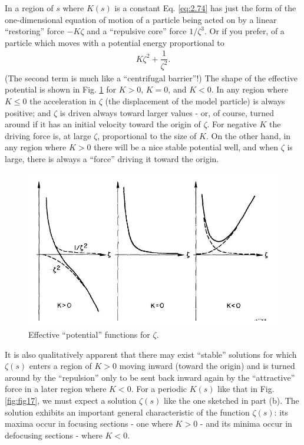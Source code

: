 In a region of $s$ where $K(s)$ is a constant Eq. \eqref{eq:2.74} has just the form of the
one-dimensional equation of motion of a particle being acted on by a linear “restoring” force $-K\zeta$ and a “repulsive core” force $1/\zeta^3$. Or if you prefer, of a particle which moves with a potential energy proportional to
\begin{align*}
	K \zeta^2 + \dfrac{1}{\zeta^2}.
\end{align*}
(The second term is much like a “centrifugal barrier”!) The shape of the effective potential is shown in Fig. \ref{fig:fig16} for $K > 0$, $K = 0$, and $K < 0$. In any region where $K \leq 0$ the acceleration in $\zeta$ (the displacement of the model particle) is always positive; and $\zeta$ is driven always toward larger values - or, of course, turned around
if it has an initial velocity toward the origin of $\zeta$. For negative $K$ the driving force
is, at large $\zeta$, proportional to the size of $K$. On the other hand, in any region
where $K > 0$ there will be a nice stable potential well, and when $\zeta$ is large, there
is always a “force” driving it toward the origin.

\begin{figure}[!htb]
	\centering
	\includegraphics[width=0.8\linewidth]{./Figuras/fig16.jpeg}
	\caption{Effective ``potential'' functions for $\zeta$.}
	\label{fig:fig16}
\end{figure}

It is also qualitatively apparent that there may exist ``stable''  solutions for which $\zeta(s)$ enters a region of $K > 0$ moving inward (toward the origin) and is turned around by the ``repulsion'' only to be sent back inward again by the ``attractive'' force in a later region where $K < 0$. For a periodic $K(s)$ like that in Fig. \ref{fig:fig17}, we must expect a solution $\zeta(s)$ like the one sketched in part (b). The solution exhibits an important general characteristic of the function $\zeta(s)$: its maxima occur in focusing sections - one where $K > 0$ - and its minima occur in defocusing sections - where $K < 0$.


